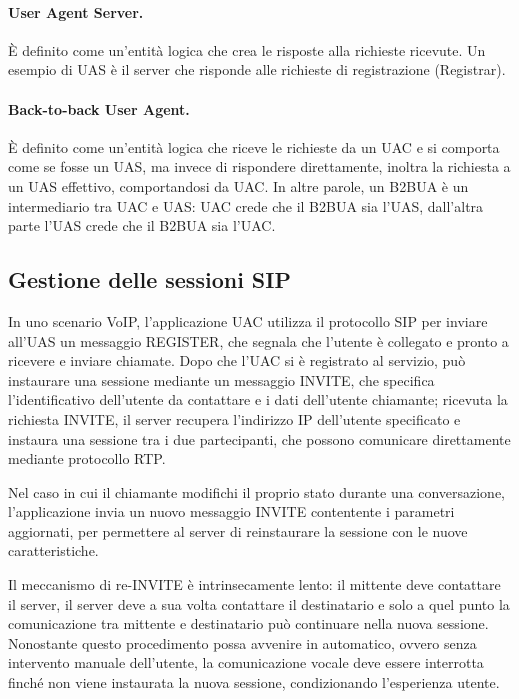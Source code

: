 \documentclass[12pt,a4paper,openright,twoside]{book}
\begin{document}
\paragraph{User Agent Server.}
È definito come un'entità logica che crea le risposte alla richieste
ricevute. Un esempio di UAS è il server che risponde alle richieste di
registrazione (Registrar).

\paragraph{Back-to-back User Agent.}

È definito come un'entità logica che riceve le richieste da un UAC e
si comporta come se fosse un UAS, ma invece di rispondere
direttamente, inoltra la richiesta a un UAS effettivo, comportandosi
da UAC. In altre parole, un B2BUA è un intermediario tra UAC e UAS:
UAC crede che il B2BUA sia l'UAS, dall'altra parte l'UAS crede che il
B2BUA sia l'UAC.

\subsection{Gestione delle sessioni SIP}

In uno scenario VoIP, l'applicazione UAC utilizza il protocollo SIP
per inviare all'UAS un messaggio REGISTER, che segnala che l'utente è
collegato e pronto a ricevere e inviare chiamate. Dopo che l'UAC si è
registrato al servizio, può instaurare una sessione mediante un
messaggio INVITE, che specifica l'identificativo dell'utente da
contattare e i dati dell'utente chiamante; ricevuta la richiesta
INVITE, il server recupera l'indirizzo IP dell'utente specificato e
instaura una sessione tra i due partecipanti, che possono comunicare
direttamente mediante protocollo RTP.

Nel caso in cui il chiamante modifichi il proprio stato durante una
conversazione, l'applicazione invia un nuovo messaggio INVITE
contentente i parametri aggiornati, per permettere al server di
reinstaurare la sessione con le nuove caratteristiche.

Il meccanismo di re-INVITE è intrinsecamente lento: il mittente deve
contattare il server, il server deve a sua volta contattare il
destinatario e solo a quel punto la comunicazione tra mittente e
destinatario può continuare nella nuova sessione. Nonostante questo
procedimento possa avvenire in automatico, ovvero senza intervento
manuale dell'utente, la comunicazione vocale deve essere interrotta
finché non viene instaurata la nuova sessione, condizionando
l'esperienza utente.
\end{document}
